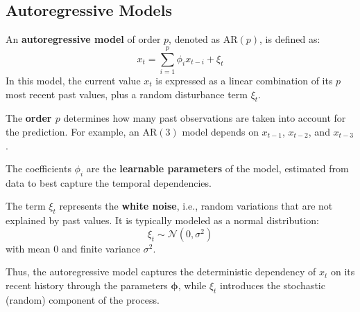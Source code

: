 \subsection{Autoregressive Models}
An \textbf{autoregressive model} of order $p$, denoted as $\text{AR}(p)$, is defined as:
\[
x_t = \sum_{i=1}^{p} \phi_i x_{t-i} + \xi_t
\]
In this model, the current value $x_t$ is expressed as a linear combination of its $p$ most recent past values, plus a random disturbance term $\xi_t$.
\begin{compactitemize}
    \item The \textbf{order $p$} determines how many past observations are taken into account for the prediction. For example, an $\text{AR}(3)$ model depends on $x_{t-1}$, $x_{t-2}$, and $x_{t-3}$.
    \item The coefficients $\phi_i$ are the \textbf{learnable parameters} of the model, estimated from data to best capture the temporal dependencies.
    \item The term $\xi_t$ represents the \textbf{white noise}, i.e., random variations that are not explained by past values. It is typically modeled as a normal distribution:
    \[
    \xi_t \sim \mathcal{N}(0, \sigma^2)
    \]
    with mean $0$ and finite variance $\sigma^2$.
\end{compactitemize}
Thus, the autoregressive model captures the deterministic dependency of $x_t$ on its recent history through the parameters $\boldsymbol{\phi}$, while $\xi_t$ introduces the stochastic (random) component of the process.

